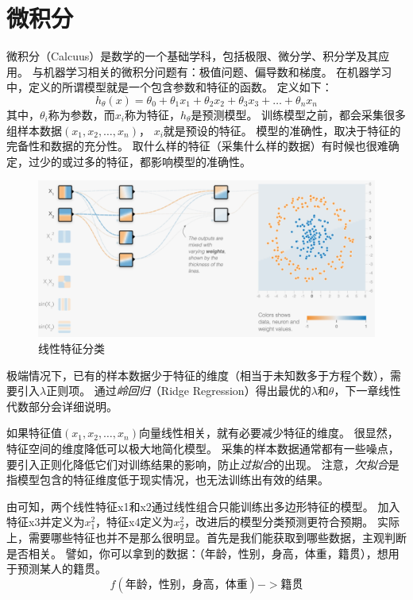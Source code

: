 \chapter{微积分}
\label{chap:calculus}
微积分（Calcuus）是数学的一个基础学科，包括极限、微分学、积分学及其应用。
与机器学习相关的微积分问题有：极值问题、偏导数和梯度。
在机器学习中，定义的所谓模型就是一个包含参数和特征的函数。
定义如下：
$$h_{\theta}(x)=\theta_0+\theta_1x_1+\theta_2x_2+\theta_3x_3+\dots+\theta_nx_n$$
其中，$\theta_i$称为参数，而$x_i$称为特征，$h_{\theta}$是预测模型。
训练模型之前，都会采集很多组样本数据$(x_1, x_2, \dots, x_n)$，
$x_i$就是预设的特征。
模型的准确性，取决于特征的完备性和数据的充分性。
取什么样的特征（采集什么样的数据）有时候也很难确定，过少的或过多的特征，都影响模型的准确性。

\begin{figure}[!htb]
	\centerline{\includegraphics[width=.50\figwidth]{images/x1x2relu.png}}
	\caption{线性特征分类}
	\label{fig:part2_math_x1x2relu}
\end{figure}

极端情况下，已有的样本数据少于特征的维度（相当于未知数多于方程个数），需要引入$\lambda$正则项。
通过\emph{岭回归}（Ridge Regression）得出最优的$\lambda$和$\theta$，下一章线性代数部分会详细说明。

如果特征值$(x_1, x_2, \dots, x_n)$向量线性相关，就有必要减少特征的维度。
很显然，特征空间的维度降低可以极大地简化模型。
采集的样本数据通常都有一些噪点，要引入正则化降低它们对训练结果的影响，防止\emph{过拟合}的出现。
注意，\emph{欠拟合}是指模型包含的特征维度低于现实情况，也无法训练出有效的结果。

由可知，两个线性特征x1和x2通过线性组合只能训练出多边形特征的模型。
加入特征x3并定义为$x_1^2$，特征x4定义为$x_2^2$，改进后的模型分类预测更符合预期。
实际上，需要哪些特征也并不是那么很明显。首先是我们能获取到哪些数据，主观判断是否相关。
譬如，你可以拿到的数据：（年龄，性别，身高，体重，籍贯），想用于预测某人的籍贯。
$$f(\text{年龄，性别，身高，体重}) -> \text{籍贯}$$

